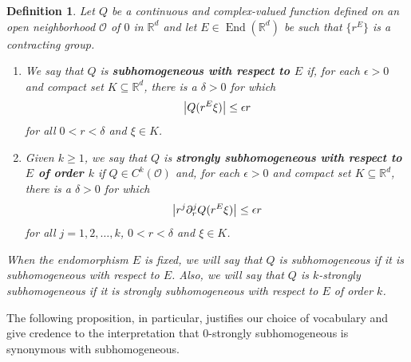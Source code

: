 \documentclass[11pt, letter]{book}
\newtheorem{definition}[theorem]{Definition}
\newcommand\End{\operatorname{End}} %
\begin{document}
\begin{framed}
\begin{definition}\label{def:homogeneous_types}
Let $Q$ be a continuous and complex-valued function defined on an open neighborhood $\mathcal{O}$ of $0$ in $\mathbb{R}^d$ and let $E\in\End(\mathbb{R}^d)$ be such that $\{r^E\}$ is a contracting group.
\begin{enumerate}
\item We say that $Q$ is \textbf{subhomogeneous with respect to $E$} if, for each $\epsilon>0$ and compact set $K\subseteq\mathbb{R}^d$, there is a $\delta>0$ for which
\begin{equation*}
\abs{Q(r^E\xi)}\leq \epsilon r
\end{equation*}
for all $0<r<\delta$ and $\xi\in K$.
\item Given $k\geq 1$, we say that $Q$ is \textbf{strongly subhomogeneous with respect to $E$ of order $k$} if $Q\in C^k(\mathcal{O})$ and, for each $\epsilon>0$ and compact set $K\subseteq\mathbb{R}^d$, there is a $\delta>0$ for which
\begin{equation*}
    \abs{r^j\partial_r^j Q(r^E\xi)}\leq \epsilon r
\end{equation*}
for all $j=1,2,\dots,k$, $0<r<\delta$ and $\xi\in K$.
\end{enumerate}
When the endomorphism $E$ is fixed, we will say that $Q$ is subhomogeneous if it is subhomogeneous with respect to $E$. Also, we will say that $Q$ is $k$-strongly subhomogeneous if it is strongly subhomogeneous with respect to $E$ of order $k$.
\end{definition}
\end{framed}
\noindent The following proposition, in particular, justifies our choice of vocabulary and give credence to the interpretation that $0$-strongly subhomogeneous is synonymous with subhomogeneous.
\end{document}
